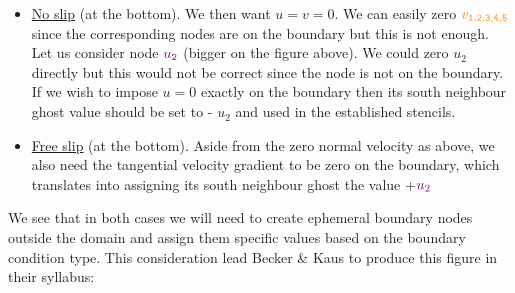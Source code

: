 \begin{itemize}
\item \underline{No slip} (at the bottom). We then want $u=v=0$. We can easily zero 
${\color{orange} v_{\tt 1,2,3,4,5}}$ since the corresponding nodes are on the boundary but this is not enough. Let us consider node ${\color{violet}u_{\tt 2}}$ (bigger on the figure above). 
We could zero $u_2$ directly but this would not be correct since the node is not on the boundary.
If we wish to impose $u=0$ exactly on the boundary then its south neighbour ghost value should be set to
-{\color{violet} $u_2$} and used in the established stencils.


\begin{center}
\end{center}


\item \underline{Free slip} (at the bottom). Aside from the zero normal velocity 
as above, we also need the tangential velocity gradient to be zero on the boundary, 
which translates into assigning its south neighbour ghost the value +${\color{violet} u_2}$ 
\end{itemize}

We see that in both cases we will need to create ephemeral boundary nodes outside the domain and assign
them specific values based on the boundary condition type. 
This consideration lead Becker \& Kaus to produce this figure in their syllabus:

